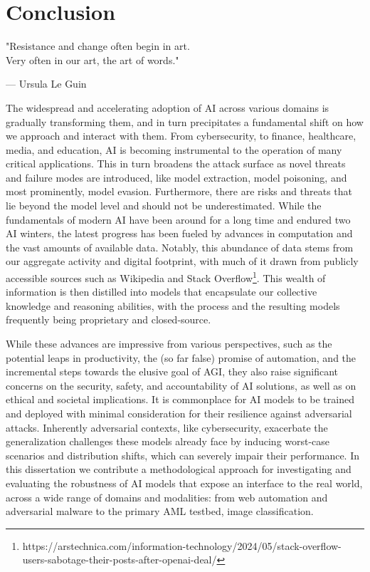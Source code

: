 \chapter{Conclusion}\label{ch:conclusion}

\epigraph{"Resistance and change often begin in art.\\Very often in our art, the art of words."}{--- Ursula Le Guin}

The widespread and accelerating adoption of \gls{AI} across various domains is gradually transforming them, and in turn precipitates a fundamental shift on how we approach and interact with them. 
From cybersecurity, to finance, healthcare, media, and education, AI is becoming instrumental to the operation of many critical applications.
This in turn broadens the attack surface as novel threats and failure modes are introduced, like model extraction, model poisoning, and most prominently, model evasion.
Furthermore, there are risks and threats that lie beyond the model level and should not be underestimated.
While the fundamentals of modern AI have been around for a long time and endured two \gls{AI} winters, the latest progress has been fueled by advances in computation and the vast amounts of available data.
Notably, this abundance of data stems from our aggregate activity and digital footprint, with much of it drawn from publicly accessible sources such as Wikipedia and Stack Overflow\footnote{https://arstechnica.com/information-technology/2024/05/stack-overflow-users-sabotage-their-posts-after-openai-deal/}.
This wealth of information is then distilled into models that encapsulate our collective knowledge and reasoning abilities, with the process and the resulting models frequently being proprietary and closed-source.

While these advances are impressive from various perspectives, such as the potential leaps in productivity, the (so far false) promise of automation, and the incremental steps towards the elusive goal of \gls{AGI}, they also raise significant concerns on the security, safety, and accountability of \gls{AI} solutions, as well as on ethical and societal implications.
It is commonplace for \gls{AI} models to be trained and deployed with minimal consideration for their resilience against adversarial attacks.
Inherently adversarial contexts, like cybersecurity, exacerbate the generalization challenges these models already face by inducing worst-case scenarios and distribution shifts, which can severely impair their performance.
In this dissertation we contribute a methodological approach for investigating and evaluating the robustness of AI models that expose an interface to the real world, across a wide range of domains and modalities: from web automation and adversarial malware to the primary \gls{AML} testbed, image classification.


